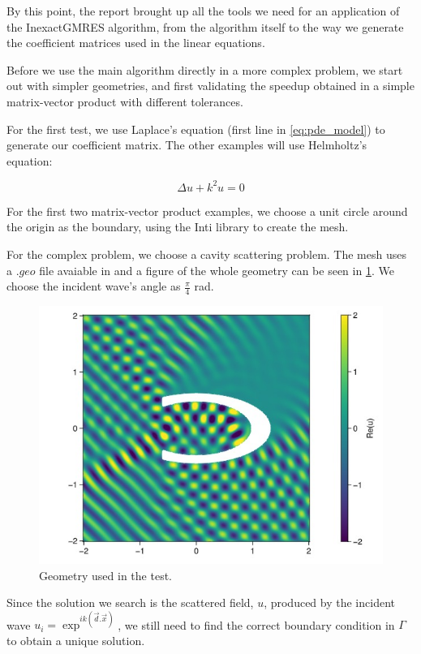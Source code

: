 
By this point, the report brought up all the tools we need for an application of the InexactGMRES algorithm, from the algorithm itself to the way we generate the coefficient matrices used in the linear equations.

Before we use the main algorithm directly in a more complex problem, we start out with simpler geometries, and first validating the speedup obtained in a simple matrix-vector product with different tolerances.

For the first test, we use Laplace's equation (first line in \ref{eq:pde_model}) to generate our coefficient matrix. The other examples will use Helmholtz's equation:

\begin{equation}\label{eq:helmholtz}
    \Delta u + k^{2}u = 0
\end{equation}

For the first two matrix-vector product examples, we choose a unit circle around the origin as the boundary, using the Inti library \cite{git-inti} to create the mesh.


For the complex problem, we choose a cavity scattering problem. The mesh uses a $.geo$ file
avaiable in \cite{git_dudu} and a figure of the whole geometry can be seen in \ref{fig:cavity_fig}. We choose the incident wave's angle as $\frac{\pi}{4}$ rad.

\begin{figure}[h!]
    \centering
    \includegraphics[width=0.6\linewidth]{images/cavity_fig.jpg}
    \caption{Geometry used in the test.}
    \label{fig:cavity_fig}
\end{figure}


Since the solution we search is the scattered field, $u$, produced by the incident wave $u_{i} = \exp^{ik(\vec{d}.\vec{x})}$, we still need to find the correct boundary condition in $\Gamma$ to obtain a unique solution.

